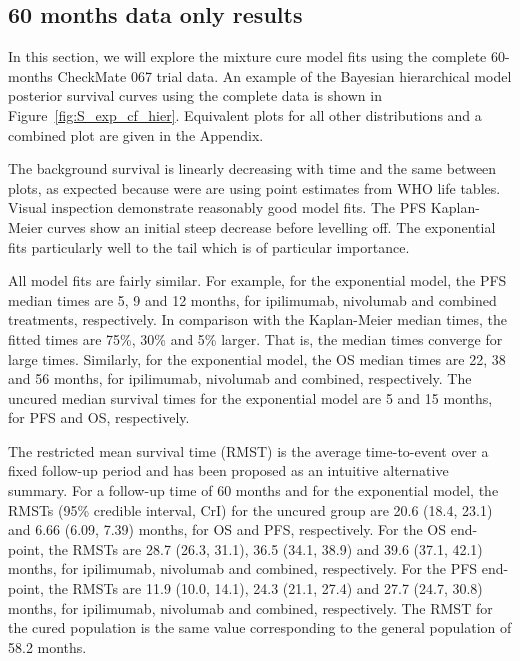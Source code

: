 \documentclass[AMA,STIX1COL]{WileyNJD-v2}
\begin{document}
%
\subsection{60 months data only results} \label{sec:results}
In this section, we will explore the mixture cure model fits using the complete 60-months CheckMate 067 trial data.
An example of the Bayesian hierarchical model posterior survival curves using the complete data is shown in Figure~\ref{fig:S_exp_cf_hier}.
Equivalent plots for all other distributions and a combined plot are given in the Appendix.

The background survival is linearly decreasing with time and the same between plots, as expected because were are using point estimates from WHO life tables.
Visual inspection demonstrate reasonably good model fits.
The PFS Kaplan-Meier curves show an initial steep decrease before levelling off.
The exponential fits particularly well to the tail which is of particular importance.

All model fits are fairly similar. For example, for the exponential model, the PFS median times are 5, 9 and 12 months, for ipilimumab, nivolumab and combined treatments, respectively.
In comparison with the Kaplan-Meier median times, the fitted times are 75\%, 30\% and 5\% larger. That is, the median times converge for large times.
Similarly, for the exponential model, the OS median times are 22, 38 and 56 months, for ipilimumab, nivolumab and combined, respectively.
The uncured median survival times for the exponential model are 5 and 15 months, for PFS and OS, respectively.

The restricted mean survival time (RMST) is the average time-to-event over a fixed follow-up period and has been proposed as an intuitive alternative summary.
For a follow-up time of 60 months and for the exponential model, the RMSTs (95\% credible interval, CrI) for the uncured group are 20.6 (18.4, 23.1) and 6.66 (6.09, 7.39) months, for OS and PFS, respectively. 
For the OS end-point, the RMSTs are 28.7 (26.3, 31.1), 36.5 (34.1, 38.9) and 39.6 (37.1, 42.1) months, for ipilimumab, nivolumab and combined, respectively.
For the PFS end-point, the RMSTs are 11.9 (10.0, 14.1), 24.3 (21.1, 27.4) and 27.7 (24.7, 30.8) months, for ipilimumab, nivolumab and combined, respectively.
The RMST for the cured population is the same value corresponding to the general population of 58.2 months.

\end{document}
